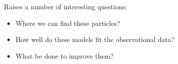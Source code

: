 

Raises a number of interesting questions:

\begin{itemize}
    \item Where we can find these particles?
    \item How well do these models fit the observational data?
    \item What be done to improve them?
\end{itemize}


